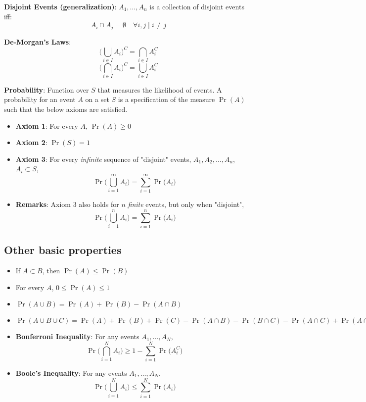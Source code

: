 \documentclass[english, 11pt]{article}
\begin{document}
{\bf Disjoint Events (generalization)}:
$A_1, \ldots, A_n$ is a collection of disjoint events iff: \\
\[ A_i \cap A_j = \emptyset \quad \forall i, j \mid  i \neq j \]

{\bf De-Morgan's Laws}:
\[ \bigg( \bigcup_{i \in I} A_i \bigg)^C = \bigcap_{i \in I} A_i^C  \]
\[ \bigg( \bigcap_{i \in I} A_i \bigg)^C = \bigcup_{i \in I} A_i^C  \]


{\bf Probability}: Function over $S$ that measures the likelihood of events. A probability for an event $A$ on a set $S$ is a specification of the measure $\Pr(A)$ such that the below axioms are satisfied. \\

\begin{itemize}
\item {\bf Axiom 1}: For every $A$, $\Pr(A) \ge 0$ 
\item {\bf Axiom 2}: $\Pr(S) = 1$
\item {\bf Axiom 3}: For every {\it infinite} sequence of "disjoint" events, $A_1, A_2, \ldots, A_n$, $A_i \subset S$,\\
\[ \Pr \bigg( \bigcup_{i=1}^{\infty} A_i \bigg) = \sum_{i=1}^{\infty} \Pr \bigg( A_i \bigg) \] 
\item {\bf Remarks}: Axiom 3 also holds for $n$ {\it finite} events, but only when "disjoint",
\[ \Pr \bigg( \bigcup_{i=1}^{n} A_i \bigg) = \sum_{i=1}^{n} \Pr \bigg( A_i \bigg) \] 
\end{itemize}

\subsection{Other basic properties}
\begin{itemize}
\item If $A \subset B$, then $\Pr(A) \le \Pr(B)$ 
\item For every $A$, $0 \le \Pr(A) \le 1$
\item $\Pr(A \cup B) = \Pr(A) + \Pr(B) - \Pr(A \cap B)$
\item $\Pr(A \cup B \cup C) = \Pr(A) + \Pr(B) + \Pr(C) - \Pr(A \cap B) - \Pr(B \cap C) - \Pr(A \cap C) + \Pr(A \cap B \cap C)$
\item {\bf Bonferroni Inequality}: For any events $A_1, \ldots, A_N $, 
\[ \Pr \bigg( \bigcap_{i=1}^{N} A_i \bigg) \ge 1 - \sum_{i=1}^{N} \Pr \bigg( A_i^C \bigg) \]

\item {\bf Boole's Inequality}: For any events $A_1, \ldots, A_N $, 
\[ \Pr \bigg( \bigcup_{i=1}^{N} A_i \bigg) \le \sum_{i=1}^{N} \Pr \bigg( A_i \bigg) \]
\end{itemize}
\end{document}

